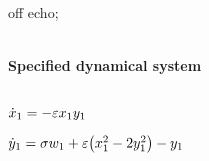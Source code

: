 
off echo;


\begin{math}
\end{math}
\paragraph{Specified dynamical system}
\begin{math}
\end{math}\par

\begin{math}
\dot x_{1}=-\varepsilon x_{1} y_{1}
\end{math}\par

\begin{math}
\dot y_{1}=\sigma  w_{1}+\varepsilon \big(x_{1}^{2}-2 y_{1}^{2}\big)-y_{1}
\end{math}\par
